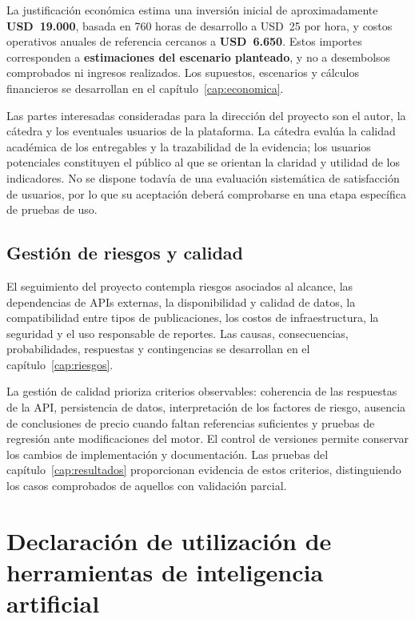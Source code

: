 La justificación económica estima una inversión inicial de aproximadamente \textbf{USD~19.000}, basada en 760 horas de desarrollo a USD~25 por hora, y costos operativos anuales de referencia cercanos a \textbf{USD~6.650}. Estos importes corresponden a \textbf{estimaciones del escenario planteado}, y no a desembolsos comprobados ni ingresos realizados. Los supuestos, escenarios y cálculos financieros se desarrollan en el capítulo~\ref{cap:economica}.

Las partes interesadas consideradas para la dirección del proyecto son el autor, la cátedra y los eventuales usuarios de la plataforma. La cátedra evalúa la calidad académica de los entregables y la trazabilidad de la evidencia; los usuarios potenciales constituyen el público al que se orientan la claridad y utilidad de los indicadores. No se dispone todavía de una evaluación sistemática de satisfacción de usuarios, por lo que su aceptación deberá comprobarse en una etapa específica de pruebas de uso.

\subsection{Gestión de riesgos y calidad}\label{subsec:ml-calidad}

El seguimiento del proyecto contempla riesgos asociados al alcance, las dependencias de APIs externas, la disponibilidad y calidad de datos, la compatibilidad entre tipos de publicaciones, los costos de infraestructura, la seguridad y el uso responsable de reportes. Las causas, consecuencias, probabilidades, respuestas y contingencias se desarrollan en el capítulo~\ref{cap:riesgos}.

La gestión de calidad prioriza criterios observables: coherencia de las respuestas de la API, persistencia de datos, interpretación de los factores de riesgo, ausencia de conclusiones de precio cuando faltan referencias suficientes y pruebas de regresión ante modificaciones del motor. El control de versiones permite conservar los cambios de implementación y documentación. Las pruebas del capítulo~\ref{cap:resultados} proporcionan evidencia de estos criterios, distinguiendo los casos comprobados de aquellos con validación parcial.

\section{Declaración de utilización de herramientas de inteligencia artificial}\label{sec:ml-uso-ia}

